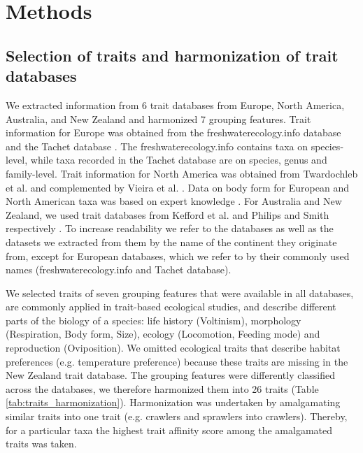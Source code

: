 \documentclass{article}
\begin{document}
\newpage

\section*{Methods}

\subsection*{Selection of traits and harmonization of trait databases}

We extracted information from 6 trait databases from Europe, North America, Australia, and New Zealand and harmonized 7 grouping features. Trait information for Europe was obtained from the freshwaterecology.info database \cite{schmidt-kloiber_www.freshwaterecology.info_2015} and the Tachet database \cite{usseglio-polatera_biomonitoring_2000}. The freshwaterecology.info contains taxa on species-level, while taxa recorded in the Tachet database are on species, genus and family-level. Trait information for North America was obtained from Twardochleb et al. \cite{twardochleb_trait_data_2020} and complemented by Vieira et al. \cite{vieira_database_nodate}. Data on body form for European and North American taxa was based on expert knowledge \cite{polatera_personal_information_2020}. For Australia and New Zealand, we used trait databases from Kefford et al. \cite{kefford_integrated_2020} and Philips and Smith respectively \cite{Philips_and_Smith_NZ_DB_2018}. To increase readability we refer to the databases as well as the datasets we extracted from them by the name of the continent they originate from, except for European databases, which we refer to by their commonly used names (freshwaterecology.info and Tachet database). 
 
We selected traits of seven grouping features that were available in all databases, are commonly applied in trait-based ecological studies, and describe different parts of the biology of a species: life history (Voltinism), morphology (Respiration, Body form, Size), ecology (Locomotion, Feeding mode) and reproduction (Oviposition). We omitted ecological traits that describe habitat preferences (e.g. temperature preference) because these traits are missing in the New Zealand trait database. The grouping features were differently classified across the databases, we therefore harmonized them into 26 traits (Table \ref{tab:traits_harmonization}). Harmonization was undertaken by amalgamating similar traits into one trait (e.g. crawlers and sprawlers into crawlers). Thereby, for a particular taxa the highest trait affinity score among the amalgamated traits was taken. 
\end{document}
